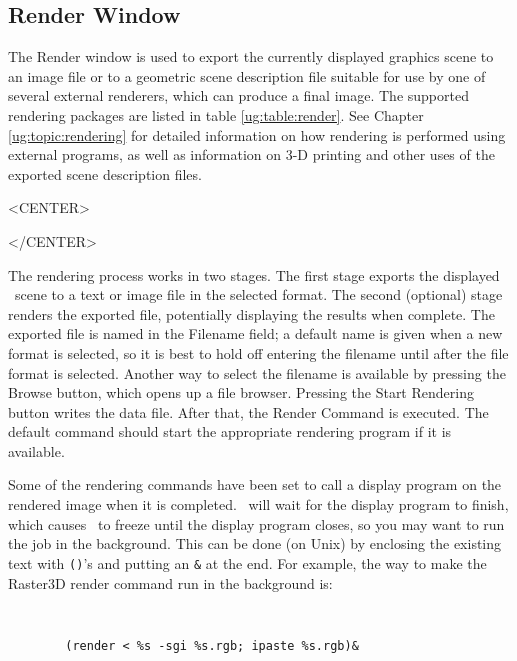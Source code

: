 %
%
%


\subsection{Render Window}
\label{ug:ui:window:render}

The Render window is used to export the currently displayed graphics scene to
an image file or to a geometric scene description file suitable for use
by one of several external renderers, which can produce a final image.
The supported rendering packages are listed in table \ref{ug:table:render}.  
See Chapter \ref{ug:topic:rendering}
for detailed information on how rendering is performed using 
external programs, as well as information on 3-D printing and 
other uses of the exported scene description files.

\begin{rawhtml}
<CENTER>
\end{rawhtml}
\begin{rawhtml}
</CENTER>
\end{rawhtml}

The rendering process works in two stages.  The first stage
exports the displayed \VMD\ scene to a text or image file
in the selected format.
The second (optional) stage renders the exported file,
potentially displaying the results when complete.  
The exported file is named in the {\sf Filename} field; 
a default name is given when a new format is selected, 
so it is best to hold off entering the filename until after
the file format is selected.  Another way to select the filename is
available by pressing the {\sf Browse}  button, which opens up a file
browser.
Pressing the {\sf Start Rendering} button writes the data file.  After
that, the {\sf Render Command} is executed.  The default command
should start the appropriate rendering program if it is available.

Some of the rendering commands have been set to call a display 
program on the rendered image when it is completed.
\VMD\ will wait for the display program to finish, which causes \VMD\ 
to freeze until the display program closes, 
so you may want to run the job in the background.  This can be done 
(on Unix) by enclosing the existing text with {\tt ()}'s and putting
an {\tt \&} at the end.  For example, the way to make the Raster3D render 
command run in the background is:
{\tt 
\begin{verbatim}
        (render < %s -sgi %s.rgb; ipaste %s.rgb)&
\end{verbatim}
}

